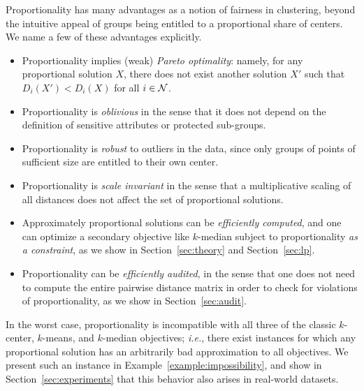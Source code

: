 Proportionality has many advantages as a notion of fairness in clustering, beyond the intuitive appeal of groups being entitled to a proportional share of centers. We name a few of these advantages explicitly.
\begin{itemize}
	\item Proportionality implies (weak) \textit{Pareto optimality}: namely, for any proportional solution $X$, there does not exist another solution $X'$ such that $D_i(X') < D_i(X)$ for all $i \in \mathcal {N}$.
	\item Proportionality is \textit{oblivious} in the sense that it does not depend on the definition of sensitive attributes or protected sub-groups.
	\item Proportionality is \textit{robust} to outliers in the data, since only groups of points of sufficient size are entitled to their own center. %
	\item Proportionality is \textit{scale invariant} in the sense that a multiplicative scaling of all distances does not affect the set of proportional solutions.
	\item Approximately proportional solutions can be \textit{efficiently computed}, and one can optimize a secondary objective like $k$-median subject to proportionality \textit{as a constraint}, as we show in Section~\ref{sec:theory} and Section~\ref{sec:lp}.
	\item Proportionality can be \textit{efficiently audited}, in the sense that one does not need to compute the entire pairwise distance matrix in order to check for violations of proportionality, as we show in Section~\ref{sec:audit}.
\end{itemize}

In the worst case, proportionality is incompatible with all three of the classic $k$-center, $k$-means, and $k$-median objectives; {\em i.e.}, there exist instances for which any proportional solution has an arbitrarily bad approximation to all objectives.  We present such an instance in Example~\ref{example:impossibility}, and show in Section~\ref{sec:experiments} that this behavior also arises in real-world datasets.  %

